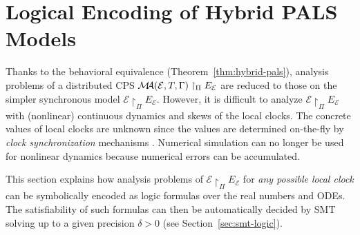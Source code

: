

\section{Logical Encoding of Hybrid PALS Models}
\label{sec:smt-encoding}

Thanks to the behavioral equivalence (Theorem~\ref{thm:hybrid-pals}),
analysis problems of a distributed CPS $\mathcal{M}\!\!\mathcal{A}(\mathcal{E}, T, \Gamma) \restriction_{\Pi} E_\mathcal{E}$
are reduced to those on the simpler synchronous model $\mathcal{E} \restriction_{\Pi} E_\mathcal{E}$.
However, it is difficult to analyze $\mathcal{E} \restriction_{\Pi} E_\mathcal{E}$ 
with (nonlinear)  continuous dynamics and skews of the local clocks.
The concrete values of local clocks are unknown since the values %
are determined on-the-fly by  \emph{clock synchronization} mechanisms \cite{pals-rtss09,lynch-book}.
Numerical simulation can no longer be used for nonlinear dynamics
because numerical errors can be accumulated.

This section explains how analysis problems of 
$\mathcal{E}\restriction_{\Pi}E_\mathcal{E}$ for \emph{any possible local clock}
can be symbolically encoded as logic formulas over the real numbers and ODEs.
The satisfiability of such formulas can then be automatically decided by SMT solving up to a given precision $\delta > 0$
(see Section~\ref{sec:smt-logic}).



